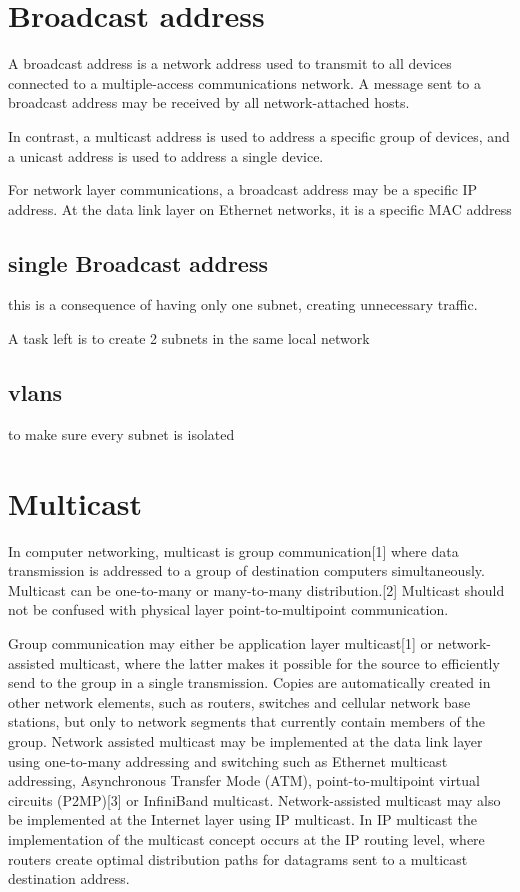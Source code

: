\documentclass[a4paper,12pt]{article}
\begin{document}
\section{Broadcast address}
A broadcast address is a network address used to transmit to all devices connected to a multiple-access communications network. A message sent to a broadcast address may be received by all network-attached hosts.

In contrast, a multicast address is used to address a specific group of devices, and a unicast address is used to address a single device.

For network layer communications, a broadcast address may be a specific IP address. At the data link layer on Ethernet networks, it is a specific MAC address
\subsection{single Broadcast address}
this is a consequence of having only one subnet, creating unnecessary traffic.

A task left is to create 2 subnets in the same local network
\subsection{vlans}
to make sure every subnet is isolated

\section{Multicast}
In computer networking, multicast is group communication[1] where data transmission is addressed to a group of destination computers simultaneously. Multicast can be one-to-many or many-to-many distribution.[2] Multicast should not be confused with physical layer point-to-multipoint communication.

Group communication may either be application layer multicast[1] or network-assisted multicast, where the latter makes it possible for the source to efficiently send to the group in a single transmission. Copies are automatically created in other network elements, such as routers, switches and cellular network base stations, but only to network segments that currently contain members of the group. Network assisted multicast may be implemented at the data link layer using one-to-many addressing and switching such as Ethernet multicast addressing, Asynchronous Transfer Mode (ATM), point-to-multipoint virtual circuits (P2MP)[3] or InfiniBand multicast. Network-assisted multicast may also be implemented at the Internet layer using IP multicast. In IP multicast the implementation of the multicast concept occurs at the IP routing level, where routers create optimal distribution paths for datagrams sent to a multicast destination address.
\end{document}
